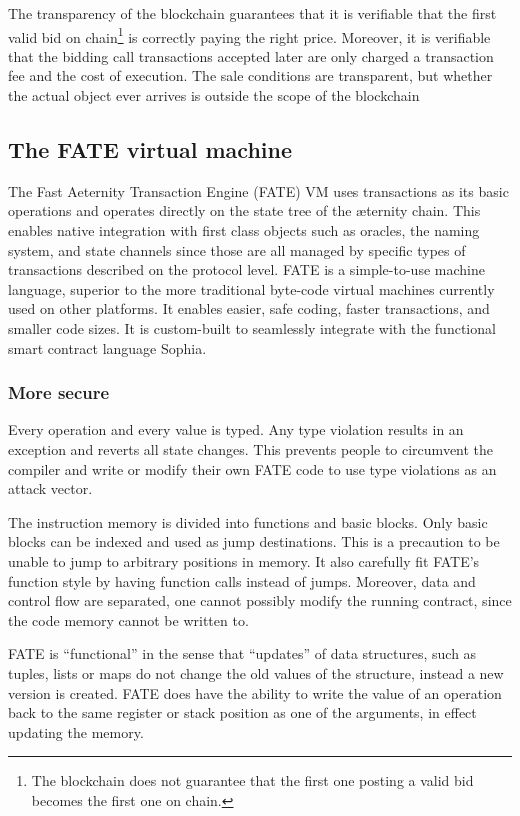 The transparency of the blockchain guarantees that it is verifiable
that the first valid bid on chain\footnote{The blockchain
  does not guarantee that the first one posting a valid bid becomes
  the first one on chain.} is correctly paying the right
price. Moreover, it is verifiable that the bidding call transactions accepted later are
only charged a transaction fee and the cost of execution.
The sale conditions are transparent, but whether the actual object ever
arrives is outside the scope of the blockchain

\subsection{The FATE virtual machine}
\label{sect:fate}

The Fast Aeternity Transaction Engine (FATE) VM uses transactions as
its basic operations and operates directly on the state tree of the
æternity chain. This enables native integration with first class
objects such as oracles, the naming system, and state channels since
those are all managed by specific types of transactions described on
the protocol level. FATE is a simple-to-use machine language, superior
to the more traditional byte-code virtual machines currently used on
other platforms. It enables easier, safe coding, faster transactions,
and smaller code sizes. It is custom-built to seamlessly integrate
with the functional smart contract language Sophia.

\subsubsection{More secure}

Every operation and every value is typed. Any type violation results in
an exception and reverts all state changes. This prevents people to
circumvent the compiler and write or modify their own FATE code to use
type violations as an attack vector.

The instruction memory is divided into functions and basic
blocks. Only basic blocks can be indexed and used as jump
destinations. This is a precaution to be unable to jump to arbitrary
positions in memory. It also carefully fit FATE's function style by
having function calls instead of jumps. Moreover, data and control
flow are separated, one cannot possibly modify the running
contract, since the code memory cannot be written to.

FATE is “functional” in the sense that “updates” of data structures,
such as tuples, lists or maps do not change the old values of the
structure, instead a new version is created.  FATE does have the
ability to write the value of an operation back to the same register
or stack position as one of the arguments, in effect updating the
memory.

